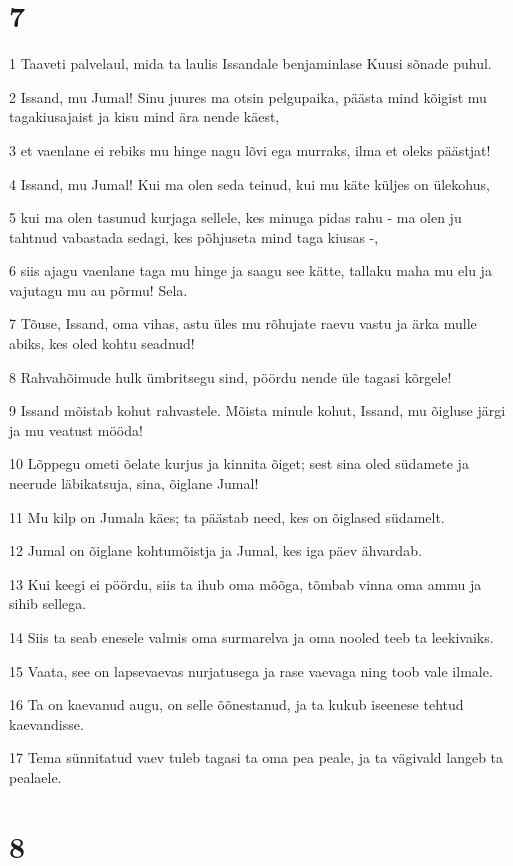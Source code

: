 \chapter{7}

\par 1 Taaveti palvelaul, mida ta laulis Issandale benjaminlase Kuusi sõnade puhul.
\par 2 Issand, mu Jumal! Sinu juures ma otsin pelgupaika, päästa mind kõigist mu tagakiusajaist ja kisu mind ära nende käest,
\par 3 et vaenlane ei rebiks mu hinge nagu lõvi ega murraks, ilma et oleks päästjat!
\par 4 Issand, mu Jumal! Kui ma olen seda teinud, kui mu käte küljes on ülekohus,
\par 5 kui ma olen tasunud kurjaga sellele, kes minuga pidas rahu - ma olen ju tahtnud vabastada sedagi, kes põhjuseta mind taga kiusas -,
\par 6 siis ajagu vaenlane taga mu hinge ja saagu see kätte, tallaku maha mu elu ja vajutagu mu au põrmu! Sela.
\par 7 Tõuse, Issand, oma vihas, astu üles mu rõhujate raevu vastu ja ärka mulle abiks, kes oled kohtu seadnud!
\par 8 Rahvahõimude hulk ümbritsegu sind, pöördu nende üle tagasi kõrgele!
\par 9 Issand mõistab kohut rahvastele. Mõista minule kohut, Issand, mu õigluse järgi ja mu veatust mööda!
\par 10 Lõppegu ometi õelate kurjus ja kinnita õiget; sest sina oled südamete ja neerude läbikatsuja, sina, õiglane Jumal!
\par 11 Mu kilp on Jumala käes; ta päästab need, kes on õiglased südamelt.
\par 12 Jumal on õiglane kohtumõistja ja Jumal, kes iga päev ähvardab.
\par 13 Kui keegi ei pöördu, siis ta ihub oma mõõga, tõmbab vinna oma ammu ja sihib sellega.
\par 14 Siis ta seab enesele valmis oma surmarelva ja oma nooled teeb ta leekivaiks.
\par 15 Vaata, see on lapsevaevas nurjatusega ja rase vaevaga ning toob vale ilmale.
\par 16 Ta on kaevanud augu, on selle õõnestanud, ja ta kukub iseenese tehtud kaevandisse.
\par 17 Tema sünnitatud vaev tuleb tagasi ta oma pea peale, ja ta vägivald langeb ta pealaele.

\chapter{8}

